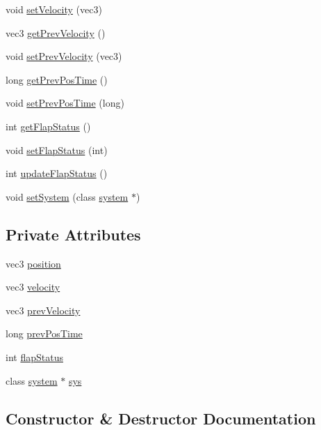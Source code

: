 \begin{DoxyCompactItemize}
void \mbox{\hyperlink{classboid_ac4e66a9e65ea2e7362f6ac7af2f4fe64}{set\+Velocity}} (vec3)
\item 
vec3 \mbox{\hyperlink{classboid_a9e4a3515298169b581618cf1fbcedcc4}{get\+Prev\+Velocity}} ()
\item 
void \mbox{\hyperlink{classboid_a61aff8ed86684833832d1417a7c24346}{set\+Prev\+Velocity}} (vec3)
\item 
long \mbox{\hyperlink{classboid_ac518e9fb5d7ad104641e254d58f9ae6e}{get\+Prev\+Pos\+Time}} ()
\item 
void \mbox{\hyperlink{classboid_a93dc299e67fc16129a99ef712b2e2e85}{set\+Prev\+Pos\+Time}} (long)
\item 
int \mbox{\hyperlink{classboid_afe9b3c0b99cf7e10cfe5b3a04cebc733}{get\+Flap\+Status}} ()
\item 
void \mbox{\hyperlink{classboid_a9dd824da8b99de54ad8956a9d1f2ca1c}{set\+Flap\+Status}} (int)
\item 
int \mbox{\hyperlink{classboid_a3b2e087c8a4365927dbaa1a0a7d06a3a}{update\+Flap\+Status}} ()
\item 
void \mbox{\hyperlink{classboid_a80894b58a6f76451d4e999b3852f9f63}{set\+System}} (class \mbox{\hyperlink{classsystem}{system}} $\ast$)
\end{DoxyCompactItemize}
\subsection*{Private Attributes}
\begin{DoxyCompactItemize}
\item 
vec3 \mbox{\hyperlink{classboid_a4a2816c0ff88a50c72dcc794f3a0c725}{position}}
\item 
vec3 \mbox{\hyperlink{classboid_a3493756cee09f08fd9cd2a49e8891b55}{velocity}}
\item 
vec3 \mbox{\hyperlink{classboid_a6673ea539a629b2fffbbc57e3ef56d19}{prev\+Velocity}}
\item 
long \mbox{\hyperlink{classboid_a4efec718a6ef62318a1221a07d05d0f1}{prev\+Pos\+Time}}
\item 
int \mbox{\hyperlink{classboid_a5c51e87fc048ba3f179b8d45b76673c5}{flap\+Status}}
\item 
class \mbox{\hyperlink{classsystem}{system}} $\ast$ \mbox{\hyperlink{classboid_aa1a06f851311eb6de9fefdffc4c5a99e}{sys}}
\end{DoxyCompactItemize}


\subsection{Constructor \& Destructor Documentation}
\mbox{\label{classboid_a679e9c54388b10b996afc304736f7f9f}} 
